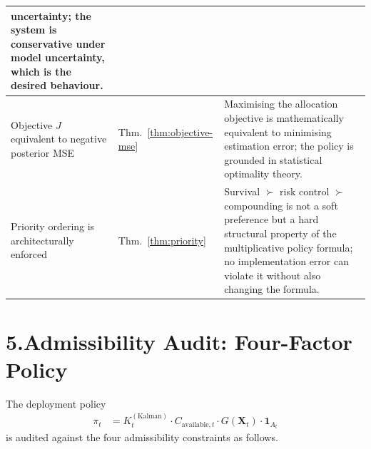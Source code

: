 \documentclass[12pt,openany]{book}
\numberwithin{equation}{chapter}
\theoremstyle{plain}
\theoremstyle{definition}
\theoremstyle{remark}
\def\mathcal#1{#1}%
\begin{document}
\begin{table}[H]
\begin{tabularx}{\linewidth}{@{} p{3.2cm} l X @{}}
    uncertainty; the system is conservative under
    model uncertainty, which is the desired behaviour. \\
\midrule
Objective $J$ equivalent to
negative posterior MSE
  & Thm.~\ref{thm:objective-mse}
  & Maximising the allocation objective is mathematically
    equivalent to minimising estimation error; the policy
    is grounded in statistical optimality theory. \\
\midrule
Priority ordering is architecturally
enforced
  & Thm.~\ref{thm:priority}
  & Survival $\succ$ risk control $\succ$ compounding is not
    a soft preference but a hard structural property of the
    multiplicative policy formula; no implementation error
    can violate it without also changing the formula. \\
\bottomrule
\end{tabularx}
\end{table}

\section*{5.\enspace Admissibility Audit: Four-Factor Policy}

\noindent
The deployment policy
\begin{align}
  \pi_t &= K_t^{(\mathrm{Kalman})}
           \cdot C_{\mathrm{available},t}
           \cdot G(\mathbf{X}_t)
           \cdot \mathbf{1}_{\mathcal{A}_t}
           \label{eq:policy-final-audit}
\end{align}
is audited against the four admissibility constraints as follows.
\end{document}
